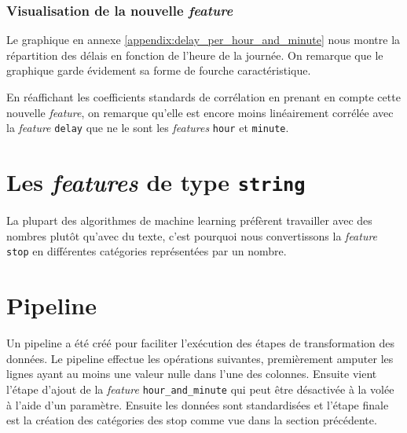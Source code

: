 \subsubsection{Visualisation de la nouvelle \textit{feature}}
Le graphique en annexe \ref{appendix:delay_per_hour_and_minute} nous montre la répartition des délais en fonction de l'heure de la journée. On remarque que le graphique garde évidement sa forme de fourche caractéristique.

En réaffichant les coefficients standards de corrélation en prenant en compte cette nouvelle \textit{feature}, on remarque qu'elle est encore moins linéairement corrélée avec la \textit{feature} \lstinline!delay! que ne le sont les \textit{features} \lstinline!hour! et \lstinline!minute!.

\section{Les \textit{features} de type \lstinline!string!}
La plupart des algorithmes de machine learning préfèrent travailler avec des nombres plutôt qu'avec du texte, c'est pourquoi nous convertissons la \textit{feature} \lstinline!stop! en différentes catégories représentées par un nombre.

\section{Pipeline}
Un pipeline a été créé pour faciliter l'exécution des étapes de transformation des données. Le pipeline effectue les opérations suivantes, premièrement amputer les lignes ayant au moins une valeur nulle dans l'une des colonnes. Ensuite vient l'étape d'ajout de la \textit{feature} \lstinline!hour_and_minute! qui peut être désactivée à la volée à l'aide d'un paramètre. Ensuite les données sont standardisées et l'étape finale est la création des catégories des stop comme vue dans la section précédente.